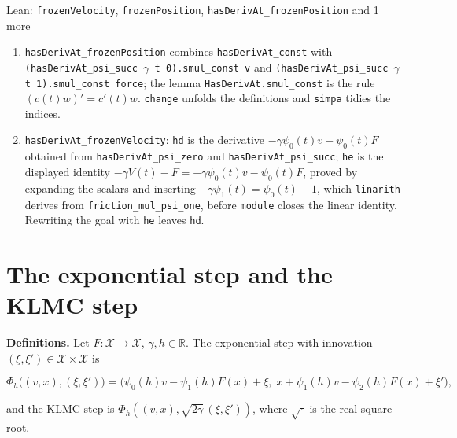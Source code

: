 \documentclass[11pt,a4paper]{article}
\begin{document}
\begin{leanbox}{Lean: \texttt{frozenVelocity}, \texttt{frozenPosition}, \texttt{hasDerivAt\_\allowbreak{}frozenPosition} and 1 more}
\begin{enumerate}
\item \texttt{has\allowbreak{}Deriv\allowbreak{}At\_\allowbreak{}frozen\allowbreak{}Position} combines \texttt{has\allowbreak{}Deriv\allowbreak{}At\_\allowbreak{}const} with \texttt{(has\allowbreak{}Deriv\allowbreak{}At\_\allowbreak{}psi\_\allowbreak{}succ \ensuremath{\gamma} t 0).\allowbreak{}smul\_\allowbreak{}const v} and \texttt{(has\allowbreak{}Deriv\allowbreak{}At\_\allowbreak{}psi\_\allowbreak{}succ \ensuremath{\gamma} t 1).\allowbreak{}smul\_\allowbreak{}const force}; the lemma \texttt{Has\allowbreak{}Deriv\allowbreak{}At.\allowbreak{}smul\_\allowbreak{}const} is the rule \((c(t)w)'=c'(t)w\). \texttt{change} unfolds the definitions and \texttt{simpa} tidies the indices.

\item \texttt{has\allowbreak{}Deriv\allowbreak{}At\_\allowbreak{}frozen\allowbreak{}Velocity}: \texttt{hd} is the derivative \(-\gamma\psi_0(t)v-\psi_0(t)F\) obtained from \texttt{has\allowbreak{}Deriv\allowbreak{}At\_\allowbreak{}psi\_\allowbreak{}zero} and \texttt{has\allowbreak{}Deriv\allowbreak{}At\_\allowbreak{}psi\_\allowbreak{}succ}; \texttt{he} is the displayed identity \(-\gamma V(t)-F=-\gamma\psi_0(t)v-\psi_0(t)F\), proved by expanding the scalars and inserting \(-\gamma\psi_1(t)=\psi_0(t)-1\), which \texttt{linarith} derives from \texttt{friction\_\allowbreak{}mul\_\allowbreak{}psi\_\allowbreak{}one}, before \texttt{module} closes the linear identity. Rewriting the goal with \texttt{he} leaves \texttt{hd}.

\end{enumerate}
\end{leanbox}

\section{\texorpdfstring{The exponential step and the KLMC step}{The exponential step and the KLMC step}}


\textbf{Definitions.} Let \(F:\mathcal X\to\mathcal X\), \(\gamma,h\in\mathbb R\). The exponential step with innovation \((\xi,\xi')\in\mathcal X\times\mathcal X\) is


\[\Phi_h\bigl((v,x),(\xi,\xi')\bigr)=\bigl(\psi_0(h)v-\psi_1(h)F(x)+\xi,\;x+\psi_1(h)v-\psi_2(h)F(x)+\xi'\bigr),\]


and the KLMC step is \(\Phi_h((v,x),\sqrt{2\gamma}\,(\xi,\xi'))\), where \(\sqrt{\cdot}\) is the real square root.
\end{document}
